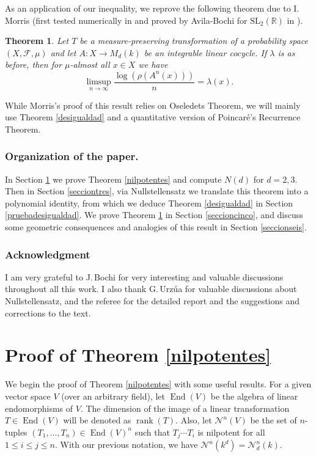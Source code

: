 \documentclass[11pt]{article}
\let\mathcal\mathscr
\theoremstyle{plain}
\newtheorem{teo}{Theorem}[section]
\theoremstyle{definition}
\newcommand{\RR}{\mathbb{R}}
\newcommand{\ccl}[3]{#1^{#2}(#3)}
\DeclareMathOperator{\End}{End}
\DeclareMathOperator{\rank}{rank}
\begin{document}
As an application of our inequality, we reprove the following theorem due to I.\,Morris (first tested numerically in \cite{fisicos} and proved by Avila-Bochi for $\mathrm{SL}_{2}(\RR)$ in \cite[Th.\,15]{avibochi}).

\begin{teo}\label{bergerwangnuevo}\cite[Th.\,1.6]{morrisbw}
Let $T$ be a measure-preserving transformation of a probability space $(X,\mathcal{F},\mu)$ and let $A: X \rightarrow M_{d}(k)$ be an integrable linear cocycle. If $\lambda$ is as before, then for $\mu$-almost all $x\in X$ we have
\begin{equation}\label{bww}
\limsup_{n\to \infty}{\frac{\log(\rho(\ccl{A}{n}{x}))}{n}=\lambda(x)}.
\end{equation}
\end{teo}

While Morris's proof of this result relies on Oseledets Theorem, we will mainly use Theorem \ref{desigualdad} and a quantitative version of Poincaré's Recurrence Theorem.

\subsubsection*{Organization of the paper.} In Section \ref{secciondos} we prove Theorem \ref{nilpotentes} and compute $N(d)$ for $d=2,3$. Then in Section \ref{secciontres}, via Nullstellensatz we translate this theorem into a polynomial identity, from which we deduce Theorem \ref{desigualdad} in Section \ref{pruebadesigualdad}. We prove Theorem \ref{bergerwangnuevo} in Section \ref{seccioncinco}, and discuss some geometric consequences and analogies of this result in Section \ref{seccionseis}.

\subsubsection*{Acknowledgment}
I am very grateful to J.\,Bochi for very interesting and valuable discussions throughout all this work. I also thank G.\,Urzúa for valuable discussions about Nullstellensatz, and the referee for the detailed report and the suggestions and corrections to the text.

\section{Proof of Theorem \ref{nilpotentes}}\label{secciondos}

We begin the proof of Theorem \ref{nilpotentes} with some useful results. For a given vector space $V$ (over an arbitrary field), let $\End(V)$ be the algebra of linear endomorphisms of $V$. The dimension of the image of a linear transformation $T\in \End(V)$ will be denoted as $\rank(T)$. Also, let $\mathcal{N}^{n}(V)$ be the set of $n$-tuples $(T_1,\dots,T_n)\in \End(V)^{n}$ such that $T_{j}\cdots T_{i}$ is nilpotent for all $1\leq i \leq j \leq n$. With our previous notation, we have $\mathcal{N}^{n}(k^{d})=\mathcal{N}^{n}_{d}(k)$.
\end{document}
